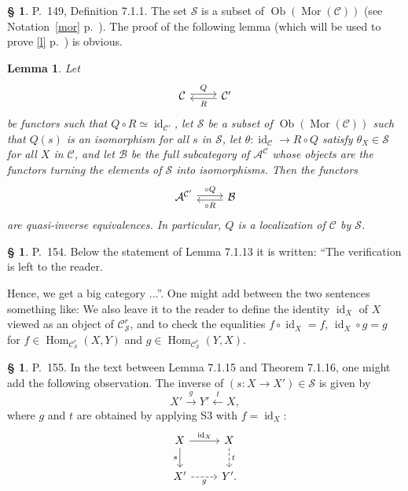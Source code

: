 \documentclass[12pt]{article}%
\newtheorem{lem}[thm]{Lemma}
\theoremstyle{remark}
\theoremstyle{definition}
\newtheorem{s}[thm]{\S}%
\newcommand{\nn}{\noindent}
\newcommand{\cc}{\mathcal}
\newcommand{\A}{\mathcal A}
\newcommand{\B}{\mathcal B}
\newcommand{\C}{\mathcal C}
\DeclareMathOperator{\id}{id}
\DeclareMathOperator{\Hom}{Hom}%
\DeclareMathOperator{\Mor}{Mor}
\DeclareMathOperator{\Ob}{Ob}
\begin{document}
\begin{s} 
P.~149, Definition 7.1.1. The set $\cc S$ is a subset of $\Ob(\Mor(\C))$ (see Notation~\ref{mor} p.~\pageref{mor}). The proof of the following lemma (which will be used to prove \eqref{l} p.~\pageref{l}) is obvious. 

\begin{lem}\label{711}
Let 
$$
\begin{tikzcd}\C\ar[yshift=.5ex]{r}{Q}&\C'\ar[yshift=-.4ex]{l}{R}\end{tikzcd}
$$ 
be functors such that $Q\circ R\simeq\id_{\C'}$, let $\cc S$ be a subset of $\Ob(\Mor(\C))$ such that $Q(s)$ is an isomorphism for all $s$ in $\cc S$, let $\theta:\id_\C\to R\circ Q$ satisfy $\theta_X\in\cc S$ for all $X$ in $\C$, and let $\B$ be the full subcategory of $\A^\C$ whose objects are the functors turning the elements of $\cc S$ into isomorphisms. Then the functors
$$
\begin{tikzcd}\A^{\C'}\ar[yshift=.4ex]{r}{\circ Q}&\B\ar[yshift=-.5ex]{l}{\circ R}\end{tikzcd}
$$
are quasi-inverse equivalences. In particular, $Q$ is a localization of $\C$ by $\cc S$. %
\end{lem}
\end{s}

%


%

\begin{s} 
P.~154. Below the statement of Lemma 7.1.13 it is written: ``The verification is left to the reader.

Hence, we get a big category ...''. One might add between the two sentences something like: We also leave it to the reader to define the identity $\id_X$ of $X$ viewed as an object of $\C^r_{\mathcal S}$, and to check the equalities $f\circ\id_X=f$, $\id_X\circ g=g$ for $f\in\Hom_{\C^r_{\mathcal S}}(X,Y)$ and $g\in\Hom_{\C^r_{\mathcal S}}(Y,X)$.
\end{s}

%

\begin{s} 
P.~155. In the text between Lemma 7.1.15 and Theorem 7.1.16, one might add the following observation. The inverse of $(s:X\to X')\in\mathcal S$ is given by 
$$
X'\overset{g}{\to}Y'\overset{t}{\leftarrow}X,
$$
where $g$ and $t$ are obtained by applying S3 with $f=\id_X$:
$$
\begin{tikzcd}
X\ar{r}{\id_X}\ar{d}[swap]{s}&X\ar[dashed]{d}{t}\\ X'\ar[dashed]{r}[swap]{g}&Y'.
\end{tikzcd}
$$
\end{s}
\end{document}
